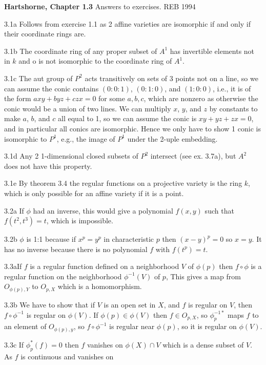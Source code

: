 \def\Z{{\bf Z}}
{\bf Hartshorne, Chapter 1.3}
Answers to exercises. \hfill REB 1994
\item{3.1a} Follows from exercise 1.1 as 2 affine varieties are isomorphic
if and only if their coordinate rings are. 
\item{3.1b} The coordinate ring of any proper subset of $A^1$ has invertible 
elements not in $k$ and o is not isomorphic to the coordinate ring of
$A^1$.  
\item{3.1c} The aut group of $P^2$ acts transitively on sets
of 3 points not on a line, so we can assume the conic contains
$(0:0:1)$, $(0:1:0)$, and $(1:0:0)$, i.e., it is of the form
$axy+byz+czx=0$ for some $a,b,c$, which are nonzero as otherwise the
conic would be a union of two lines.  We can multiply $x$, $y$, and
$z$ by constants to make $a$, $b$, and $c$ all equal to 1, so we can
assume the conic is $xy+yz+zx=0$, and in particular all conics are
isomorphic. Hence we only have to show 1 conic is isomorphic to $P^1$,
e.g., the image of $P^1$ under the 2-uple embedding.  
\item{3.1d} Any 2 1-dimensional closed subsets of $P^2$ intersect
(see ex. 3.7a), but $A^2$ does not have this property. 
\item{3.1e} By theorem 3.4 the regular functions on a projective variety
is the ring $k$, which is only possible for an affine variety if
it is a point. 
\item {3.2a} If $\phi$ had an inverse, this would give a polynomial 
$f(x,y) $ such that $f(t^2,t^3)=t$, which is impossible.
\item {3.2b} $\phi$  is 1:1 because if $x^p=y^p$ in characteristic
$p$ then $(x-y)^p=0$ so $x=y$. It has no inverse because there
is no polynomial $f$ with $f(t^p)=t$. 
\item{3.3a}If $f$ is a regular function defined on a neighborhood
$V$ of $\phi(p)$ then $f\circ\phi$ is a regular function on the neighborhood
$\phi^{-1}(V)$ of $p$,  
This gives a map from $O_{\phi(p),Y}$ to $O_{p,X}$ which is a homomorphism.
\item{3.3b} We have to show that if $V$ is an open set in $X$, and $f$ is
regular on $V$, then $f\circ \phi^{-1}$ is regular on $\phi(V)$. 
If $\phi(p)\in \phi(V)$ then $f\in O_{p,X}$, so $\phi_p^{-1*}$ maps
$f$ to an element of $O_{\phi(p),y}$, so $f\circ \phi^{-1}$ is
regular near $\phi(p)$, so it is regular on $\phi(V)$. 
\item{3.3c} If $\phi^*_p(f)=0$ then $f$ vanishes on $\phi(X)\cap V$ 
which is a dense subset of $V$. As $f$ is continuous and vanishes on 
